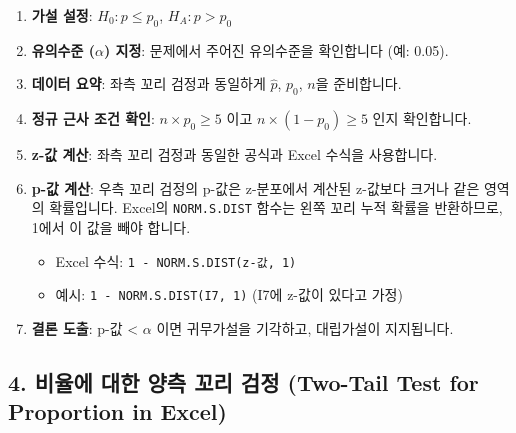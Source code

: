 \documentclass[11pt,a4paper]{book}
\theoremstyle{definition}
\begin{document}
\begin{enumerate}
    \item \textbf{가설 설정}: $H_0: p \le p_0$, $H_A: p > p_0$
    \item \textbf{유의수준 ($\alpha$) 지정}: 문제에서 주어진 유의수준을 확인합니다 (예: 0.05).
    \item \textbf{데이터 요약}: 좌측 꼬리 검정과 동일하게 $\hat{p}$, $p_0$, $n$을 준비합니다.
    \item \textbf{정규 근사 조건 확인}: $n \times p_0 \ge 5$ 이고 $n \times (1 - p_0) \ge 5$ 인지 확인합니다.
    \item \textbf{z-값 계산}: 좌측 꼬리 검정과 동일한 공식과 Excel 수식을 사용합니다.
    \item \textbf{p-값 계산}: 우측 꼬리 검정의 p-값은 z-분포에서 계산된 z-값보다 크거나 같은 영역의 확률입니다. Excel의 \texttt{NORM.S.DIST} 함수는 왼쪽 꼬리 누적 확률을 반환하므로, 1에서 이 값을 빼야 합니다.
    \begin{itemize}
        \item Excel 수식: \texttt{1 - NORM.S.DIST(z-값, 1)}
        \item 예시: \texttt{1 - NORM.S.DIST(I7, 1)} (I7에 z-값이 있다고 가정)
    \end{itemize}
    \item \textbf{결론 도출}: p-값 < $\alpha$ 이면 귀무가설을 기각하고, 대립가설이 지지됩니다.
\end{enumerate}

\subsection*{4. 비율에 대한 양측 꼬리 검정 (Two-Tail Test for Proportion in Excel)}
\end{document}
